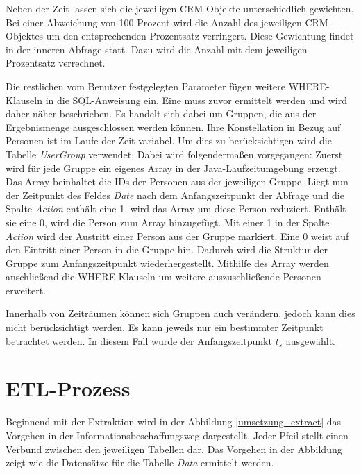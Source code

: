 Neben der Zeit lassen sich die jeweiligen CRM-Objekte unterschiedlich gewichten. Bei einer Abweichung von 100 Prozent wird die Anzahl des jeweiligen CRM-Objektes um den entsprechenden Prozentsatz verringert. Diese Gewichtung findet in der inneren Abfrage statt. Dazu wird die Anzahl mit dem jeweiligen Prozentsatz verrechnet.

Die restlichen vom Benutzer festgelegten Parameter fügen weitere WHERE-Klauseln in die SQL-Anweisung ein. Eine muss zuvor ermittelt werden und wird daher näher beschrieben. Es handelt sich dabei um Gruppen, die aus der Ergebnismenge ausgeschlossen werden können. Ihre Konstellation in Bezug auf Personen ist im Laufe der Zeit variabel. Um dies zu berücksichtigen wird die Tabelle \textit{UserGroup} verwendet. Dabei wird folgendermaßen vorgegangen: Zuerst wird für jede Gruppe ein eigenes Array in der Java-Laufzeitumgebung erzeugt. Das Array beinhaltet die IDs der Personen aus der jeweiligen Gruppe. Liegt nun der Zeitpunkt des Feldes \textit{Date} nach dem Anfangszeitpunkt der Abfrage und die Spalte \textit{Action} enthält eine 1, wird das Array um diese Person reduziert. Enthält sie eine 0, wird die Person zum Array hinzugefügt. Mit einer 1 in der Spalte \textit{Action} wird der Austritt einer Person aus der Gruppe markiert. Eine 0 weist auf den Eintritt einer Person in die Gruppe hin. Dadurch wird die Struktur der Gruppe zum Anfangszeitpunkt wiederhergestellt. Mithilfe des Array werden anschließend die WHERE-Klauseln um weitere auszuschließende Personen erweitert.

Innerhalb von Zeiträumen können sich Gruppen auch verändern, jedoch kann dies nicht berücksichtigt werden. Es kann jeweils nur ein bestimmter Zeitpunkt betrachtet werden. In diesem Fall wurde der Anfangszeitpunkt $t_{s}$ ausgewählt.

\section{ETL-Prozess}

Beginnend mit der Extraktion wird in der Abbildung \ref{umsetzung_extract} das Vorgehen in der Informationsbeschaffungsweg dargestellt. Jeder Pfeil stellt einen Verbund zwischen den jeweiligen Tabellen dar. Das Vorgehen in der Abbildung zeigt wie die Datensätze für die Tabelle \textit{Data} ermittelt werden. 


